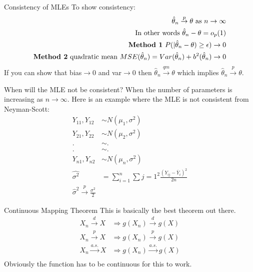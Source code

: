 \documentclass[avery5388,grid,frame]{flashcards}
\begin{document}
 \begin{flashcard}[Proof]{Consistency of MLEs}
 \bigskip\bigskip\bigskip
To show consistency:
{\begin{align*}
\hat{\theta}_n\overset{p}{\rightarrow}\theta \textrm{ as } n\rightarrow \infty\\
\textrm{In other words } \hat{\theta}_n-\theta=o_p(1)\\
\textrm{\textbf{Method 1} }P(|\hat{\theta}_n-\theta)\geq\epsilon)\rightarrow 0\\ 
\textrm{\textbf{Method 2} quadratic mean } MSE(\hat{\theta}_n)=Var(\hat{\theta}_n)+b^2(\hat{\theta}_n)\rightarrow 0\\
\end{align*}}
If you can show that bias$\rightarrow 0$ and var$\rightarrow 0$ then $\hat{\theta}_n\overset{qm}{\rightarrow}\theta$ which implies $\hat{\theta}_n\overset{p}{\rightarrow}\theta$.
\end{flashcard}
 \begin{flashcard}{When will the MLE not be consistent?}
 \bigskip
When the number of parameters is increasing as $n\rightarrow\infty$. Here is an example where the MLE is not consistent from Neyman-Scott:
{\begin{align*}
Y_{11},Y_{12}&\sim N(\mu_1,\sigma^2)\\
Y_{21},Y_{22}&\sim N(\mu_2,\sigma^2)\\
.&\sim.\\
.&\sim.\\
Y_{n1},Y_{n2}&\sim N(\mu_n,\sigma^2)\\
\hat{\sigma^2}&=\sum_{i=1}^n\sum{j=1}^2\frac{(Y_{ij}-\bar{Y}_i)^2}{2n}\\
\hat{\sigma}^2\overset{p}{\rightarrow}\frac{\sigma^2}{2}
\end{align*}}
\end{flashcard}
\begin{flashcard}[Definition]{Continuous Mapping Theorem}
 \bigskip
This is basically the best theorem out there.
{\begin{align*}
X_n\overset{d}{\rightarrow}X&\Rightarrow g(X_n)\overset{d}{\rightarrow}g(X)\\
X_n\overset{p}{\rightarrow}X&\Rightarrow g(X_n)\overset{p}{\rightarrow}g(X)\\
X_n\overset{a.s.}{\rightarrow}X&\Rightarrow g(X_n)\overset{a.s.}{\rightarrow}g(X)\\
\end{align*}}
Obviously the function has to be continuous for this to work.
\end{flashcard}
\end{document}
